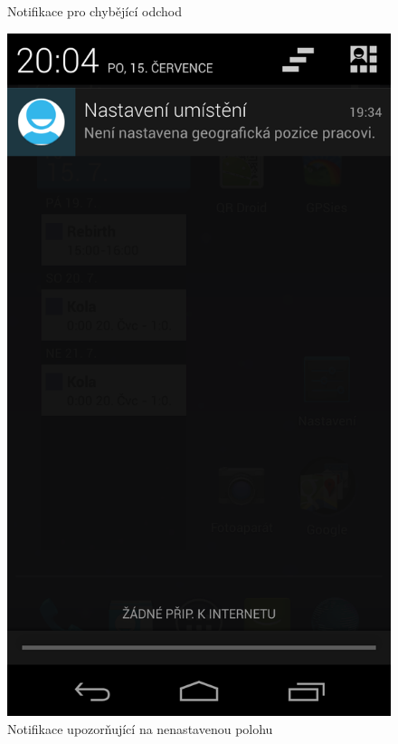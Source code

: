 \documentclass{diplomka}
\begin{document}
\begin{figure}[H]
\begin{minipage}{.45\textwidth}
   \caption{Notifikace pro chybějící odchod}
  \label{fig:notif}
\end{minipage}\hfill%
\begin{minipage}{.45\textwidth}
   \centering
 \includegraphics[width=.9\linewidth]{scr/notifnotset.png}
  \caption{Notifikace upozorňující na nenastavenou polohu}
  \label{fig:notifnotset}
\end{minipage}
\end{figure}

\newpage
\end{document}
